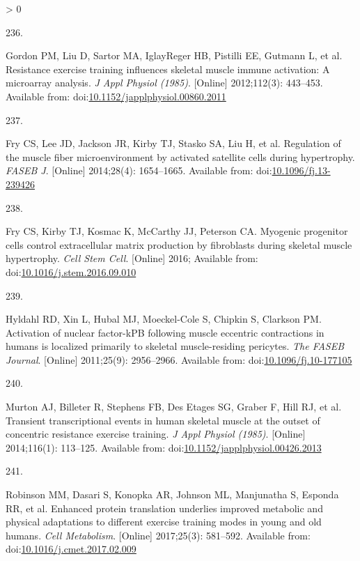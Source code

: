 \documentclass[twoside,10pt]{gihclass} %
\newlength{\cslhangindent}
\newlength{\csllabelwidth}
\newenvironment{CSLReferences}[3] %
 {%
  \setlength{\parindent}{0pt}
  \ifodd #1 \everypar{\setlength{\hangindent}{\cslhangindent}}\ignorespaces\fi
  \ifnum #2 > 0
  \setlength{\parskip}{#2\baselineskip}
  \fi
 }%
 {}
\newcommand{\CSLLeftMargin}[1]{\parbox[t]{\maxof{\widthof{#1}}{\csllabelwidth}}{#1}}
\newcommand{\CSLRightInline}[1]{\parbox[t]{\linewidth}{#1}}
\begin{document}
\begin{CSLReferences}{0}{0}
\leavevmode\hypertarget{ref-RN1825}{}%
\CSLLeftMargin{236. }
\CSLRightInline{Gordon PM, Liu D, Sartor MA, IglayReger HB, Pistilli EE, Gutmann L, et al. Resistance exercise training influences skeletal muscle immune activation: A microarray analysis. \emph{J Appl Physiol (1985)}. {[}Online{]} 2012;112(3): 443--453. Available from: doi:\href{https://doi.org/10.1152/japplphysiol.00860.2011}{10.1152/japplphysiol.00860.2011}}

\leavevmode\hypertarget{ref-RN1354}{}%
\CSLLeftMargin{237. }
\CSLRightInline{Fry CS, Lee JD, Jackson JR, Kirby TJ, Stasko SA, Liu H, et al. Regulation of the muscle fiber microenvironment by activated satellite cells during hypertrophy. \emph{FASEB J}. {[}Online{]} 2014;28(4): 1654--1665. Available from: doi:\href{https://doi.org/10.1096/fj.13-239426}{10.1096/fj.13-239426}}

\leavevmode\hypertarget{ref-RN1888}{}%
\CSLLeftMargin{238. }
\CSLRightInline{Fry CS, Kirby TJ, Kosmac K, McCarthy JJ, Peterson CA. Myogenic progenitor cells control extracellular matrix production by fibroblasts during skeletal muscle hypertrophy. \emph{Cell Stem Cell}. {[}Online{]} 2016; Available from: doi:\href{https://doi.org/10.1016/j.stem.2016.09.010}{10.1016/j.stem.2016.09.010}}

\leavevmode\hypertarget{ref-RN2408}{}%
\CSLLeftMargin{239. }
\CSLRightInline{Hyldahl RD, Xin L, Hubal MJ, Moeckel-Cole S, Chipkin S, Clarkson PM. Activation of nuclear factor-kPB following muscle eccentric contractions in humans is localized primarily to skeletal muscle-residing pericytes. \emph{The FASEB Journal}. {[}Online{]} 2011;25(9): 2956--2966. Available from: doi:\href{https://doi.org/10.1096/fj.10-177105}{10.1096/fj.10-177105}}

\leavevmode\hypertarget{ref-RN2299}{}%
\CSLLeftMargin{240. }
\CSLRightInline{Murton AJ, Billeter R, Stephens FB, Des Etages SG, Graber F, Hill RJ, et al. Transient transcriptional events in human skeletal muscle at the outset of concentric resistance exercise training. \emph{J Appl Physiol (1985)}. {[}Online{]} 2014;116(1): 113--125. Available from: doi:\href{https://doi.org/10.1152/japplphysiol.00426.2013}{10.1152/japplphysiol.00426.2013}}

\leavevmode\hypertarget{ref-RN2400}{}%
\CSLLeftMargin{241. }
\CSLRightInline{Robinson MM, Dasari S, Konopka AR, Johnson ML, Manjunatha S, Esponda RR, et al. Enhanced protein translation underlies improved metabolic and physical adaptations to different exercise training modes in young and old humans. \emph{Cell Metabolism}. {[}Online{]} 2017;25(3): 581--592. Available from: doi:\href{https://doi.org/10.1016/j.cmet.2017.02.009}{10.1016/j.cmet.2017.02.009}}


\end{CSLReferences}
\end{document}
